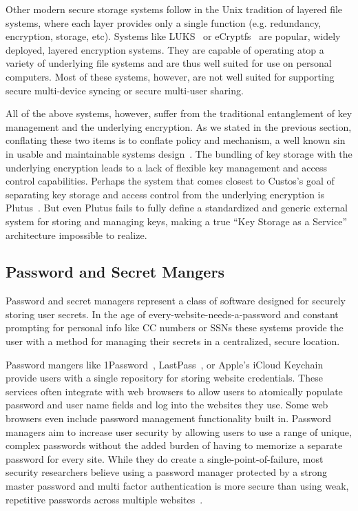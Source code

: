Other modern secure storage systems follow in the Unix tradition of
layered file systems, where each layer provides only a single function
(e.g. redundancy, encryption, storage, etc). Systems like
LUKS~\cite{luks} or eCryptfs~\cite{eCryptfs, Halcrow} are popular,
widely deployed, layered encryption systems. They are capable of
operating atop a variety of underlying file systems and are thus well
suited for use on personal computers. Most of these systems, however,
are not well suited for supporting secure multi-device syncing or
secure multi-user sharing.

All of the above systems, however, suffer from the traditional
entanglement of key management and the underlying encryption. As we
stated in the previous section, conflating these two items is to
conflate policy and mechanism, a well known sin in usable and
maintainable systems design~\cite{Wulf1974}. The bundling of key
storage with the underlying encryption leads to a lack of flexible key
management and access control capabilities. Perhaps the system that
comes closest to Custos's goal of separating key storage and access
control from the underlying encryption is
Plutus~\cite{Kallahalla2003}. But even Plutus fails to fully define a
standardized and generic external system for storing and managing
keys, making a true ``Key Storage as a Service'' architecture
impossible to realize.

\subsection{Password and Secret Mangers}

Password and secret managers represent a class of software designed
for securely storing user secrets. In the age of
every-website-needs-a-password and constant prompting for personal
info like CC numbers or SSNs these systems provide the user with a
method for managing their secrets in a centralized, secure location.

Password mangers like 1Password~\cite{onepassword},
LastPass~\cite{lastpass}, or Apple's iCloud Keychain~\cite{icloud}
provide users with a single repository for storing website
credentials. These services often integrate with web browsers to allow
users to atomically populate password and user name fields and log
into the websites they use. Some web browsers even include password
management functionality built in. Password managers aim to increase
user security by allowing users to use a range of unique, complex
passwords without the added burden of having to memorize a separate
password for every site. While they do create a
single-point-of-failure, most security researchers believe using a
password manager protected by a strong master password and multi
factor authentication is more secure than using weak, repetitive
passwords across multiple websites~\cite{schneier-passwords,
  krebs-passwords, brodkin-passman}.

